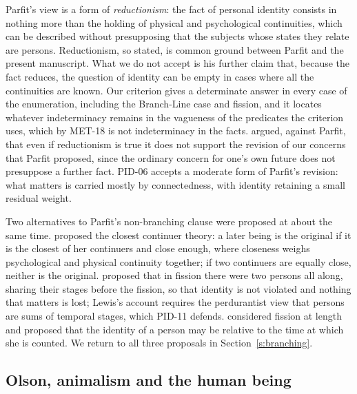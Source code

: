 \documentclass{situationist-preprint}
\begin{document}
Parfit's view is a form of \emph{reductionism}: the fact of personal identity consists in nothing more than the holding of physical and psychological continuities, which can be described without presupposing that the subjects whose states they relate are persons. Reductionism, so stated, is common ground between Parfit and the present manuscript. What we do not accept is his further claim that, because the fact reduces, the question of identity can be empty in cases where all the continuities are known. Our criterion gives a determinate answer in every case of the enumeration, including the Branch-Line case and fission, and it locates whatever indeterminacy remains in the vagueness of the predicates the criterion uses, which by MET-18 is not indeterminacy in the facts. \citet{Johnston1997} argued, against Parfit, that even if reductionism is true it does not support the revision of our concerns that Parfit proposed, since the ordinary concern for one's own future does not presuppose a further fact. PID-06 accepts a moderate form of Parfit's revision: what matters is carried mostly by connectedness, with identity retaining a small residual weight.

Two alternatives to Parfit's non-branching clause were proposed at about the same time. \citet{Nozick1981} proposed the closest continuer theory: a later being is the original if it is the closest of her continuers and close enough, where closeness weighs psychological and physical continuity together; if two continuers are equally close, neither is the original. \citet{Lewis1976} proposed that in fission there were two persons all along, sharing their stages before the fission, so that identity is not violated and nothing that matters is lost; Lewis's account requires the perdurantist view that persons are sums of temporal stages, which PID-11 defends. \citet{Perry1972} considered fission at length and proposed that the identity of a person may be relative to the time at which she is counted. We return to all three proposals in Section~\ref{s:branching}.

\subsection{Olson, animalism and the human being}
\end{document}
